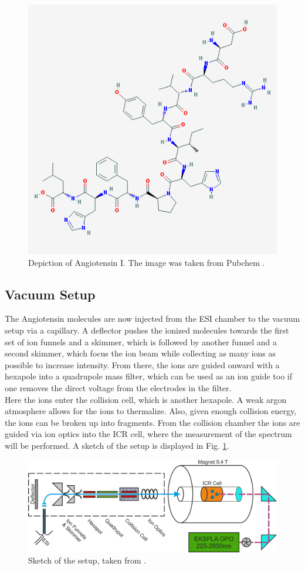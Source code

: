 \documentclass[a4paper,10pt]{article}
\begin{document}
\begin{figure}[H]
  \centering
  \includegraphics[width = 0.6 \textwidth]{angiotensin.png}
  \caption{Depiction of Angiotensin I. The image was taken from Pubchem \cite{pubchem}. }
\end{figure}

\subsection{Vacuum Setup}
The Angiotensin molecules are now injected from the ESI chamber to the vacuum setup via a capillary. A deflector pushes the ionized molecules towards the first set of ion funnels and a skimmer, which is followed by another funnel and a second skimmer, which focus the ion beam while collecting as many ions as possible to increase intensity. From there, the ions are guided onward with a hexapole into a quadrupole mass filter, which can be used as an ion guide too if one removes the direct voltage from the electrodes in the filter. \\
Here the ions enter the collision cell, which is another hexapole. A weak argon atmosphere allows for the ions to thermalize.
Also, given enough collision energy, the ions can be broken up into fragments. From the collision chamber the ions are guided via ion optics into the ICR cell, where the measurement of the spectrum will be performed. A sketch of the setup is displayed in Fig. \ref{fig_setup}.
\begin{figure}[htp!]
	\centering
	\includegraphics[width= 0.6 \textwidth]{setup.png}
	\caption{Sketch of the setup, taken from \cite{script}.}
	\label{fig_setup}
\end{figure}
\end{document}
